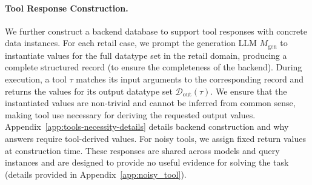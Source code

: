 
\paragraph{Tool Response Construction.}
We further construct a backend database to support tool responses with concrete data instances. 
For each retail case, we prompt the generation LLM $M_{\mathrm{gen}}$ to instantiate values for the full datatype set in the retail domain, producing a complete structured record (to ensure the completeness of the backend). 
During execution, a tool $\tau$ matches its input arguments to the corresponding record and returns the values for its output datatype set $\mathcal{D}_{\mathrm{out}}(\tau)$.
We ensure that the instantiated values are non-trivial and cannot be inferred from common sense, making tool use necessary for deriving the requested output values.
Appendix~\ref{app:tools-necessity-details} details backend construction and why answers require tool-derived values.
For noisy tools, we assign fixed return values at construction time. These responses are shared across models and query instances and are designed to provide no useful evidence for solving the task (details provided in Appendix~\ref{app:noisy_tool}).



